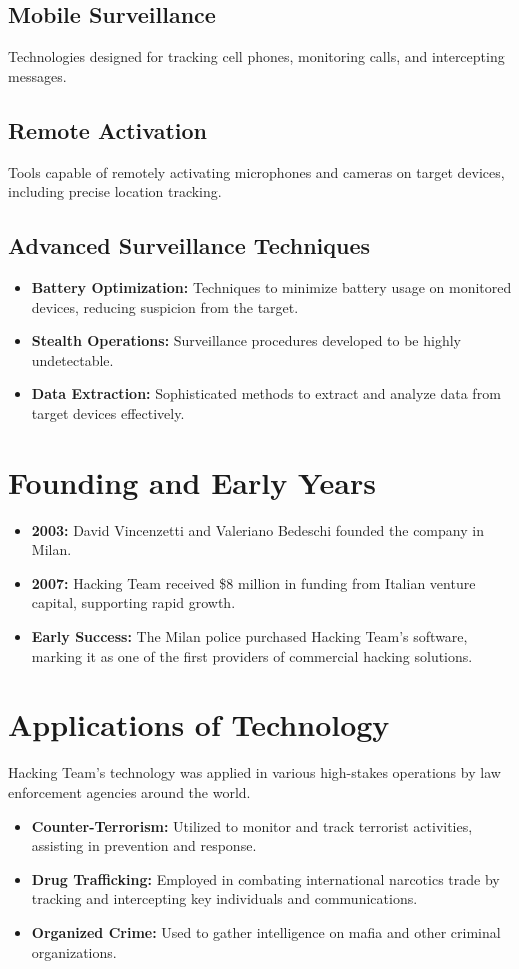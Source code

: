 \subsection{Mobile Surveillance}
Technologies designed for tracking cell phones, monitoring calls, and intercepting messages.
\subsection{Remote Activation}
Tools capable of remotely activating microphones and cameras on target devices, including precise location tracking.
\subsection{Advanced Surveillance Techniques}
\begin{itemize}
    \item \textbf{Battery Optimization:} Techniques to minimize battery usage on monitored devices, reducing suspicion from the target.
    \item \textbf{Stealth Operations:} Surveillance procedures developed to be highly undetectable.
    \item \textbf{Data Extraction:} Sophisticated methods to extract and analyze data from target devices effectively.
\end{itemize}

\section{Founding and Early Years}
\begin{itemize}
    \item \textbf{2003:} David Vincenzetti and Valeriano Bedeschi founded the company in Milan.
    \item \textbf{2007:} Hacking Team received \$8 million in funding from Italian venture capital, supporting rapid growth.
    \item \textbf{Early Success:} The Milan police purchased Hacking Team’s software, marking it as one of the first providers of commercial hacking solutions.
\end{itemize}

\section{Applications of Technology}
Hacking Team’s technology was applied in various high-stakes operations by law enforcement agencies around the world.
\begin{itemize}
    \item \textbf{Counter-Terrorism:} Utilized to monitor and track terrorist activities, assisting in prevention and response.
    \item \textbf{Drug Trafficking:} Employed in combating international narcotics trade by tracking and intercepting key individuals and communications.
    \item \textbf{Organized Crime:} Used to gather intelligence on mafia and other criminal organizations.
\end{itemize}

